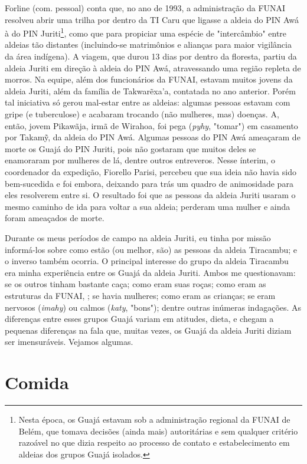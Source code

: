 Forline (com. pessoal) conta que, no ano de 1993, a administração da
FUNAI resolveu abrir uma trilha por dentro da TI Caru que ligasse a
aldeia do PIN Awá à do PIN Juriti\footnote{Nesta época, os Guajá estavam
  sob a administração regional da FUNAI de Belém, que tomava decisões
  (ainda mais) autoritárias e sem qualquer critério razoável no que
  dizia respeito ao processo de contato e estabelecimento em aldeias dos
  grupos Guajá isolados.}, como que para propiciar uma espécie de
"intercâmbio" entre aldeias tão distantes (incluindo-se matrimônios e
alianças para maior vigilância da área indígena). A viagem, que durou 13
dias por dentro da floresta, partiu da aldeia Juriti em direção à aldeia
do PIN Awá, atravessando uma região repleta de morros. Na equipe, além
dos funcionários da FUNAI, estavam muitos jovens da aldeia Juriti, além
da família de Takwarẽxa'a, contatada no ano anterior. Porém tal
iniciativa só gerou mal-estar entre as aldeias: algumas pessoas estavam
com gripe (e tuberculose) e acabaram trocando (não mulheres, mas)
doenças. A, então, jovem Pikawãja, irmã de Wirahoa, foi pega
(\emph{pyhy}, "tomar") em casamento por Takamỹ, da aldeia do PIN Awá.
Algumas pessoas do PIN Awá ameaçaram de morte os Guajá do PIN Juriti,
pois não gostaram que muitos deles se enamoraram por mulheres de lá,
dentre outros entreveros. Nesse ínterim, o coordenador da expedição,
Fiorello Parisi, percebeu que sua ideia não havia sido bem-sucedida e
foi embora, deixando para trás um quadro de animosidade para eles
resolverem entre si. O resultado foi que as pessoas da aldeia Juriti
usaram o mesmo caminho de ida para voltar a sua aldeia; perderam uma
mulher e ainda foram ameaçados de morte.

Durante os meus períodos de campo na aldeia Juriti, eu tinha por missão
informá-los sobre como estão (ou melhor, são) as pessoas da aldeia
Tiracambu; e o inverso também ocorria. O principal interesse do grupo da
aldeia Tiracambu era minha experiência entre os Guajá da aldeia Juriti.
Ambos me questionavam: se os outros tinham bastante caça; como eram suas
roças; como eram as estruturas da FUNAI, ; se havia mulheres; como eram
as crianças; se eram nervosos (\emph{imahy}) ou calmos (\emph{katy},
"bons"); dentre outras inúmeras indagações. As diferenças entre esses
grupos Guajá variam em atitudes, dieta, e chegam a pequenas diferenças
na fala que, muitas vezes, os Guajá da aldeia Juriti diziam ser
imensuráveis. Vejamos algumas.

\section{Comida}\label{comida}


